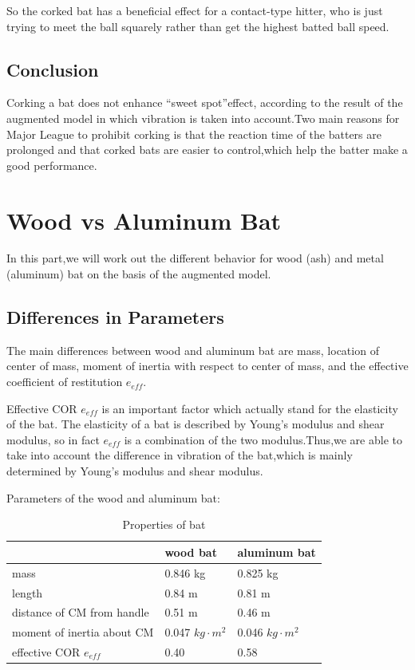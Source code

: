 \documentclass[12pt]{article}
\begin{document}
So the corked bat has a beneficial effect for a contact-type hitter, who is
just trying to meet the ball squarely rather than get the highest batted ball speed.

\subsection{Conclusion}
Corking a bat does not enhance ``sweet spot''effect, according to the result of the augmented model in which vibration is taken into account.Two main reasons for Major League to prohibit corking is that the reaction time of the batters are prolonged and that corked bats are easier to control,which help the batter make a good performance.

\section{Wood vs Aluminum Bat}
In this part,we will work out the different behavior for wood (ash) and metal (aluminum) bat on the basis of the augmented
model.
\subsection{Differences in Parameters}

The main differences between wood and aluminum bat are mass, location of center of mass, moment of inertia with respect to
center of mass, and the effective coefficient of restitution $e_{eff}$.

Effective COR $e_{eff}$ is an important factor which
actually stand for the elasticity of the bat. The elasticity of a bat is described by Young's modulus and shear modulus,
so in fact $e_{eff}$ is a combination of the two modulus.Thus,we are able to take into account the difference in vibration
of the bat,which is mainly determined by Young's modulus and shear modulus.

Parameters of the wood and aluminum bat:
\begin{center}
\begin{table}
	\caption{Properties of bat}\label{tab:thi}
\begin{tabular}{lll}
\hline
    & wood bat &aluminum bat\\
\hline
mass&0.846 kg&0.825 kg\\
length&0.84 m& 0.81 m\\
distance of CM from handle&0.51 m& 0.46 m\\
moment of inertia about CM&0.047 $kg\cdot m^2$& 0.046 $kg\cdot m^2$\\
effective COR $e_{eff}$&0.40& 0.58\\
\hline
\end{tabular}
\end{table}
\end{center}
\end{document}
